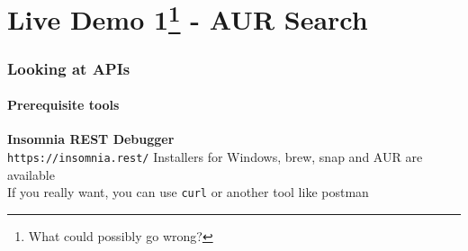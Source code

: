 \documentclass[aspectratio=169]{beamer}
\begin{document}
\section{Live Demo 1\footnote{What could possibly go wrong?} - AUR Search}

\begin{frame}
  \frametitle{Looking at APIs}
  \framesubtitle{Prerequisite tools}
  \textbf{Insomnia REST Debugger}\\
  \texttt{https://insomnia.rest/} Installers for Windows, brew, snap and AUR are available
  \\If you really want, you can use \texttt{curl} or another tool like postman

\end{frame}
\end{document}
